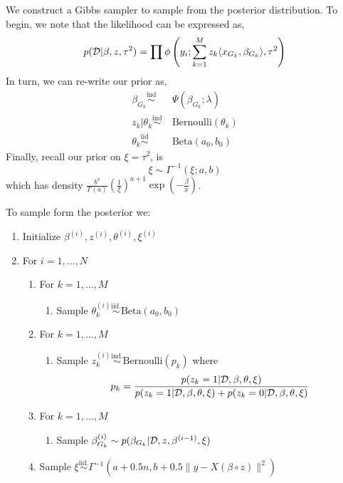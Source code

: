 \documentclass[12pt]{article}
\begin{document}
We construct a Gibbs sampler to sample from the posterior distribution. To begin, we note that the likelihood can be expressed as,
\begin{equation}
    p(\mathcal{D} | \beta, z, \tau^2) = \prod \phi \left(y_i; \sum_{k = 1}^M z_k \langle x_{G_k}, \beta_{G_k} \rangle, \tau^2 \right)
\end{equation}
In turn, we can re-write our prior as,
\begin{equation}
\begin{aligned}
    \beta_{G_k} \overset{\text{ind}}{\sim} &\ \Psi(\beta_{G_k}; \lambda) \\
z_k | \theta_k \overset{\text{ind}}{\sim} &\ \text{Bernoulli}(\theta_k) \\
\theta_k \overset{\text{iid}}{\sim} &\ \text{Beta}(a_0, b_0)
\end{aligned}
\end{equation}
Finally, recall our prior on $\xi = \tau^2$, is
\begin{equation}
    \xi \sim \Gamma^{-1}(\xi; a, b)
\end{equation}
which has density $ \frac{b^a}{\Gamma(a)} \left( \frac{1}{\xi} \right)^{a + 1} \exp\left( -\frac{\beta}{x} \right)$.

To sample form the posterior we:
\begin{enumerate}
    \itemsep0em
    \item Initialize $\beta^{(i)}, z^{(i)}, \theta^{(i)}, \xi^{(i)}$
    \item For $i = 1, \dots, N$
    \begin{enumerate}
	\item For $k = 1, \dots, M$
	\begin{enumerate}
	    \item Sample $\theta^{(i)}_{k} \overset{\text{iid.}}{\sim} \text{Beta}(a_0, b_0)$
	\end{enumerate}
	\item For $k = 1, \dots, M$
	\begin{enumerate}
	    \item Sample $z^{(i)}_{k} \overset{\text{ind.}}{\sim} \text{Bernoulli}(p_k)$
	    where
	    \begin{equation}
		p_k = \frac
		{p(z_k = 1 | \mathcal{D}, \beta, \theta, \xi)}
		{p(z_k = 1 | \mathcal{D}, \beta, \theta, \xi) + p(z_k = 0 | \mathcal{D}, \beta, \theta, \xi)}
	    \end{equation}
	\end{enumerate}
	\item For $k = 1, \dots, M$
	\begin{enumerate}
	    \item Sample $ \beta_{G_k}^{(i)} \sim p(\beta_{G_k} | \mathcal{D}, z, \beta^{(i-1)}, \xi)$
	\end{enumerate}
    \item Sample $\xi \overset{\text{iid.}}{\sim} \Gamma^{-1}(a + 0.5n, b + 0.5 \| y - X (\beta \circ z) \| ^2 )$
    \end{enumerate}
\end{enumerate}
\end{document}
